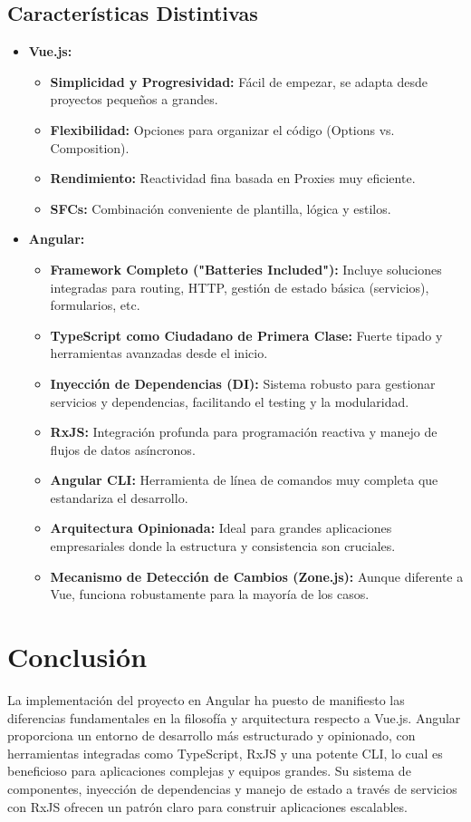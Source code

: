 \documentclass[11pt, a4paper]{article}
\begin{document}
\subsection{Características Distintivas}
\begin{itemize}
    \item \textbf{Vue.js:}
        \begin{itemize}
            \item \textbf{Simplicidad y Progresividad:} Fácil de empezar, se adapta desde proyectos pequeños a grandes.
            \item \textbf{Flexibilidad:} Opciones para organizar el código (Options vs. Composition).
            \item \textbf{Rendimiento:} Reactividad fina basada en Proxies muy eficiente.
            \item \textbf{SFCs:} Combinación conveniente de plantilla, lógica y estilos.
        \end{itemize}
    \item \textbf{Angular:}
        \begin{itemize}
            \item \textbf{Framework Completo ("Batteries Included"):} Incluye soluciones integradas para routing, HTTP, gestión de estado básica (servicios), formularios, etc.
            \item \textbf{TypeScript como Ciudadano de Primera Clase:} Fuerte tipado y herramientas avanzadas desde el inicio.
            \item \textbf{Inyección de Dependencias (DI):} Sistema robusto para gestionar servicios y dependencias, facilitando el testing y la modularidad.
            \item \textbf{RxJS:} Integración profunda para programación reactiva y manejo de flujos de datos asíncronos.
            \item \textbf{Angular CLI:} Herramienta de línea de comandos muy completa que estandariza el desarrollo.
            \item \textbf{Arquitectura Opinionada:} Ideal para grandes aplicaciones empresariales donde la estructura y consistencia son cruciales.
            \item \textbf{Mecanismo de Detección de Cambios (Zone.js):} Aunque diferente a Vue, funciona robustamente para la mayoría de los casos.
        \end{itemize}
\end{itemize}

\section{Conclusión}
La implementación del proyecto en Angular ha puesto de manifiesto las diferencias fundamentales en la filosofía y arquitectura respecto a Vue.js. Angular proporciona un entorno de desarrollo más estructurado y opinionado, con herramientas integradas como TypeScript, RxJS y una potente CLI, lo cual es beneficioso para aplicaciones complejas y equipos grandes. Su sistema de componentes, inyección de dependencias y manejo de estado a través de servicios con RxJS ofrecen un patrón claro para construir aplicaciones escalables.
\end{document}
